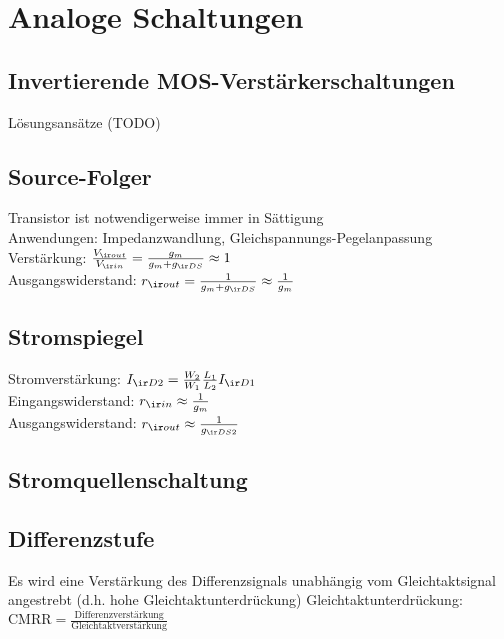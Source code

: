 \documentclass[european]{latex4ei_sheet}
\begin{document}
\section{Analoge Schaltungen}
\begin{sectionbox}
	\subsection{Invertierende MOS-Verstärkerschaltungen}
	Lösungsansätze (TODO) %
	\subsection{Source-Folger}
	Transistor ist notwendigerweise immer in Sättigung\\
	Anwendungen: Impedanzwandlung, Gleichspannungs-Pegelanpassung\\
	Verstärkung: $\frac{V_{\ir out}}{V_{\ir in}} = \frac{g_m}{g_m+g_{\ir DS}}\approx 1$\\
	Ausgangswiderstand: $r_{\ir out} = \frac{1}{g_m+g_{\ir DS}}\approx \frac{1}{g_m}$
	\subsection{Stromspiegel}
	Stromverstärkung: $I_{\ir D2} = \frac{W_2}{W_1}\frac{L_1}{L_2}I_{\ir D1}$\\
	Eingangswiderstand: $r_{\ir in} \approx \frac{1}{g_m}$\\
	Ausgangswiderstand: $r_{\ir out} \approx \frac{1}{g_{\ir DS2}}$\\
	\subsection{Stromquellenschaltung}
	\subsection{Differenzstufe} 
	Es wird eine Verstärkung des Differenzsignals unabhängig vom Gleichtaktsignal angestrebt (d.h. hohe Gleichtaktunterdrückung)
	Gleichtaktunterdrückung: $\text{CMRR} = \frac{\text{Differenzverstärkung}}{\text{Gleichtaktverstärkung}}$	
\end{sectionbox}
\end{document}
